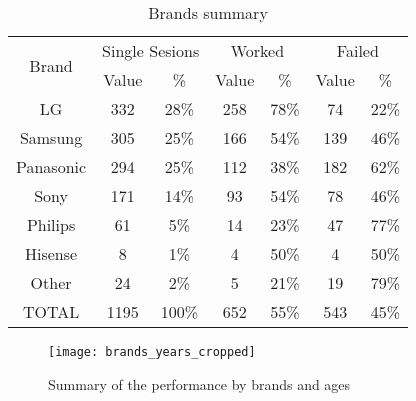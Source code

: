 \begin{table}
	\begin{center}
		\caption{Brands summary}\label{tab:brands_tab}
		\begin{tabular}{||c|c|c|c|c|c|c||}
			\hline
			\multirow{2}{*}{Brand} & \multicolumn{2}{c|}{Single Sesions} & \multicolumn{2}{c|}{Worked} & \multicolumn{2}{c||}{Failed} \\ \cline{2-7} 
			& Value            & \%               & Value         & \%          & Value           & \%            \\ \hline
			LG                     & 332              & 28\%             & 258           & 78\%        & 74              & 22\%          \\ \hline
			Samsung                & 305              & 25\%             & 166           & 54\%        & 139             & 46\%          \\ \hline
			Panasonic              & 294              & 25\%             & 112           & 38\%        & 182             & 62\%          \\ \hline
			Sony                   & 171              & 14\%             & 93            & 54\%        & 78              & 46\%          \\ \hline
			Philips                & 61               & 5\%              & 14            & 23\%        & 47              & 77\%          \\ \hline
			Hisense                & 8                & 1\%              & 4             & 50\%        & 4               & 50\%          \\ \hline
			Other                 & 24               & 2\%              & 5             & 21\%        & 19              & 79\%          \\ \hline
			TOTAL                  & 1195             & 100\%            & 652           & 55\%        & 543             & 45\%          \\ \hline
		\end{tabular}
	\end{center}
\end{table}


\begin{figure}
	\texttt{[image: brands\_years\_cropped]}
	\caption{Summary of the performance by brands and ages}
	\label{fig:brands}
\end{figure}

